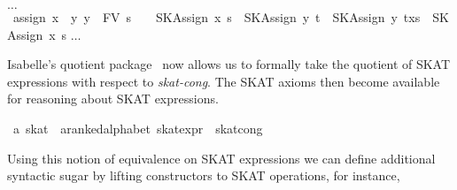 \documentclass{llncs}
\begin{document}
\begin{isabellebody}
$\dots$\isanewline
{}\ assign{}{}\ {}{}x\ {}\ y{}\ y\ {}\ FV\ s{}\ {}\isanewline\ \ \ SKAssign\ x\ s\ {}\ SKAssign\ y\ t\ {}\ SKAssign\ y\ {}t{}x{}s{}{}\ {}\ SKAssign\ x\ s{}\isanewline
$\dots$\isanewline
\end{isabellebody}

\noindent Isabelle's quotient package~\cite{Kaliszyk} now allows us to
formally take the quotient of SKAT expressions with respect to
\textit{skat-cong}. The SKAT axioms then become available for
reasoning about SKAT expressions.

\begin{isabellebody}
\isanewline
{}\isamarkupfalse%
\ {}a\ skat\ {}\ {}{}a{}{}ranked{}alphabet\ skat{}expr{}\ {}\ skat{}cong\isanewline
\end{isabellebody}

Using this notion of equivalence on SKAT expressions we can define
additional syntactic sugar by lifting constructors to SKAT operations,
for instance,
\end{document}
